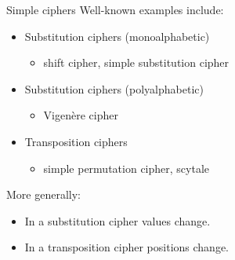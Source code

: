 \begin{frame}{Simple ciphers}
  Well-known examples include:
  \pause
  \begin{itemize}
    \item Substitution ciphers (monoalphabetic)
    \begin{itemize}
      \item shift cipher, simple substitution cipher
    \end{itemize}
    \pause
    \item Substitution ciphers (polyalphabetic)
    \begin{itemize}
      \item Vigenère cipher
    \end{itemize}
    \pause
    \item Transposition ciphers
    \begin{itemize}
      \item simple permutation cipher, scytale
    \end{itemize}
  \end{itemize}

  \vspace{1em}

  \pause
  More generally:
  \begin{itemize}
    \item In a substitution cipher values change.
    \item In a transposition cipher positions change.
  \end{itemize}

\end{frame}

